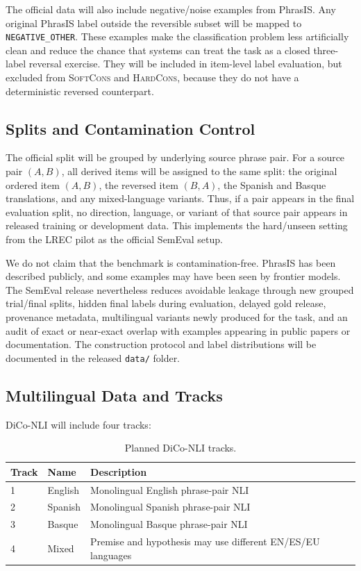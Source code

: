 \documentclass[11pt]{article}
\begin{document}
The official data will also include negative/noise examples from PhrasIS.
Any original PhrasIS label outside the reversible subset will be mapped to \texttt{NEGATIVE\_OTHER}.
These examples make the classification problem less artificially clean and reduce the chance that systems can treat the task as a closed three-label reversal exercise.
They will be included in item-level label evaluation, but excluded from \textsc{SoftCons} and \textsc{HardCons}, because they do not have a deterministic reversed counterpart.

\subsection{Splits and Contamination Control}

The official split will be grouped by underlying source phrase pair.
For a source pair \((A,B)\), all derived items will be assigned to the same split: the original ordered item \((A,B)\), the reversed item \((B,A)\), the Spanish and Basque translations, and any mixed-language variants.
Thus, if a pair appears in the final evaluation split, no direction, language, or variant of that source pair appears in released training or development data.
This implements the hard/unseen setting from the LREC pilot as the official SemEval setup.

We do not claim that the benchmark is contamination-free.
PhrasIS has been described publicly, and some examples may have been seen by frontier models.
The SemEval release nevertheless reduces avoidable leakage through new grouped trial/final splits, hidden final labels during evaluation, delayed gold release, provenance metadata, multilingual variants newly produced for the task, and an audit of exact or near-exact overlap with examples appearing in public papers or documentation.
The construction protocol and label distributions will be documented in the released \texttt{data/} folder.

\subsection{Multilingual Data and Tracks}

DiCo-NLI will include four tracks:

\begin{table}[t]
\centering
\small
\begin{tabular}{lll}
\toprule
Track & Name & Description \\
\midrule
1 & English & Monolingual English phrase-pair NLI \\
2 & Spanish & Monolingual Spanish phrase-pair NLI \\
3 & Basque & Monolingual Basque phrase-pair NLI \\
4 & Mixed & Premise and hypothesis may use different EN/ES/EU languages \\
\bottomrule
\end{tabular}
\caption{Planned DiCo-NLI tracks.}
\label{tab:tracks}
\end{table}
\end{document}
